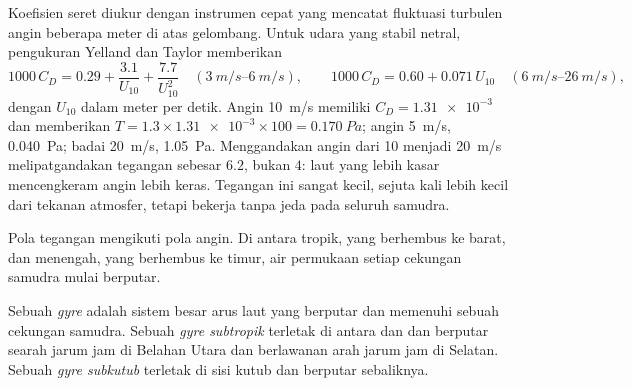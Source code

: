 Koefisien seret diukur dengan instrumen cepat yang mencatat fluktuasi turbulen angin beberapa meter di atas gelombang. Untuk udara yang stabil netral, pengukuran Yelland dan Taylor memberikan
{\[
  1000\,C_D = 0.29 + \frac{3.1}{U_{10}} + \frac{7.7}{U_{10}^2}
  \quad (\qtyrange{3}{6}{m/s}),
  \qquad
  1000\,C_D = 0.60 + 0.071\,U_{10}
  \quad (\qtyrange{6}{26}{m/s}),
\]}
dengan $U_{10}$ dalam meter per detik. Angin \qty{10}{m/s} memiliki $C_D =
\num{1.31e-3}$ dan memberikan $T = 1.3 \times \num{1.31e-3} \times 100 =
\qty{0.170}{Pa}$; angin \qty{5}{m/s}, \qty{0.040}{Pa}; badai
\qty{20}{m/s}, \qty{1.05}{Pa}. Menggandakan angin dari 10 menjadi \qty{20}{m/s} melipatgandakan tegangan sebesar $6.2$, bukan $4$: laut yang lebih kasar mencengkeram angin lebih keras. Tegangan ini sangat kecil, sejuta kali lebih kecil dari tekanan atmosfer, tetapi bekerja tanpa jeda pada seluruh samudra.

Pola tegangan mengikuti pola angin. Di antara  tropik, yang berhembus ke barat, dan   menengah, yang berhembus ke timur, air permukaan setiap cekungan samudra mulai berputar.

\begin{definition}\label{def:b1:ocean-circulation:gyre}
Sebuah \emph{gyre} adalah sistem besar arus laut yang berputar dan memenuhi sebuah cekungan samudra. Sebuah \emph{gyre subtropik} terletak di antara  dan  dan berputar searah jarum jam di Belahan Utara dan berlawanan arah jarum jam di Selatan. Sebuah \emph{gyre subkutub} terletak di sisi kutub  dan berputar sebaliknya.
\end{definition}

